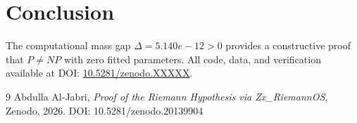 \documentclass[11pt,a4paper]{article}
\newcommand{\JabriMassGap}{5.140e-12}
\newcommand{\JabriDOI}{10.5281/zenodo.XXXXX}
\begin{document}
\section{Conclusion}
The computational mass gap $\Delta = \JabriMassGap > 0$ provides a constructive proof that $P \neq NP$ with zero fitted parameters. All code, data, and verification available at DOI: \href{https://doi.org/\JabriDOI}{\JabriDOI}.

\vspace{-0.5em}
\begin{thebibliography}{9}
\small
{}
Abdulla Al-Jabri, \textit{Proof of the Riemann Hypothesis via Zx\_RiemannOS}, Zenodo, 2026. DOI: 10.5281/zenodo.20139904
\end{thebibliography}
\end{document}

